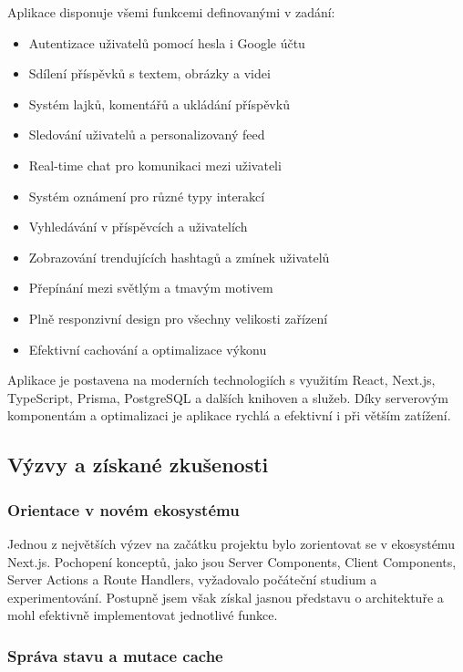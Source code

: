 \documentclass[12pt]{article}
\begin{document}
Aplikace disponuje všemi funkcemi definovanými v zadání:
\begin{itemize}
    \item Autentizace uživatelů pomocí hesla i Google účtu
    \item Sdílení příspěvků s textem, obrázky a videi
    \item Systém lajků, komentářů a ukládání příspěvků
    \item Sledování uživatelů a personalizovaný feed
    \item Real-time chat pro komunikaci mezi uživateli
    \item Systém oznámení pro různé typy interakcí
    \item Vyhledávání v příspěvcích a uživatelích
    \item Zobrazování trendujících hashtagů a zmínek uživatelů
    \item Přepínání mezi světlým a tmavým motivem
    \item Plně responzivní design pro všechny velikosti zařízení
    \item Efektivní cachování a optimalizace výkonu
\end{itemize}

Aplikace je postavena na moderních technologiích s využitím React, Next.js, TypeScript, Prisma, PostgreSQL a dalších knihoven a služeb. Díky serverovým komponentám a optimalizaci je aplikace rychlá a efektivní i při větším zatížení.

\subsection{Výzvy a získané zkušenosti}

\subsubsection{Orientace v novém ekosystému}

Jednou z největších výzev na začátku projektu bylo zorientovat se v ekosystému Next.js. Pochopení konceptů, jako jsou Server Components, Client Components, Server Actions a Route Handlers, vyžadovalo počáteční studium a experimentování. Postupně jsem však získal jasnou představu o architektuře a mohl efektivně implementovat jednotlivé funkce.

\subsubsection{Správa stavu a mutace cache}
\end{document}

